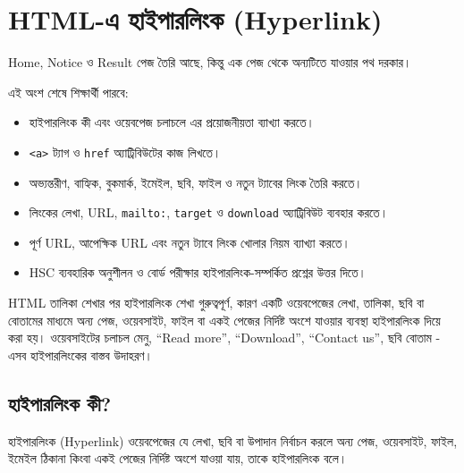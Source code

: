 \section{HTML-এ হাইপারলিংক (Hyperlink)}

Home, Notice ও Result পেজ তৈরি আছে, কিন্তু এক পেজ থেকে অন্যটিতে যাওয়ার পথ দরকার।



\begin{learningbox}
এই অংশ শেষে শিক্ষার্থী পারবে:
\begin{itemize}
\item হাইপারলিংক কী এবং ওয়েবপেজ চলাচলে এর প্রয়োজনীয়তা ব্যাখ্যা করতে।
\item \texttt{<a>} ট্যাগ ও \texttt{href} অ্যাট্রিবিউটের কাজ লিখতে।
\item অভ্যন্তরীণ, বাহ্যিক, বুকমার্ক, ইমেইল, ছবি, ফাইল ও নতুন ট্যাবের লিংক তৈরি করতে।
\item লিংকের লেখা, URL, \texttt{mailto:}, \texttt{target} ও \texttt{download} অ্যাট্রিবিউট ব্যবহার করতে।
\item পূর্ণ URL, আপেক্ষিক URL এবং নতুন ট্যাবে লিংক খোলার নিয়ম ব্যাখ্যা করতে।
\item HSC ব্যবহারিক অনুশীলন ও বোর্ড পরীক্ষার হাইপারলিংক-সম্পর্কিত প্রশ্নের উত্তর দিতে।
\end{itemize}
\end{learningbox}



HTML তালিকা শেখার পর হাইপারলিংক শেখা গুরুত্বপূর্ণ, কারণ একটি ওয়েবপেজের লেখা, তালিকা, ছবি বা বোতামের মাধ্যমে অন্য পেজ, ওয়েবসাইট, ফাইল বা একই পেজের নির্দিষ্ট অংশে যাওয়ার ব্যবস্থা হাইপারলিংক দিয়ে করা হয়। ওয়েবসাইটের চলাচল মেনু, ``Read more'', ``Download'', ``Contact us'', ছবি বোতাম - এসব হাইপারলিংকের বাস্তব উদাহরণ।

\subsection{হাইপারলিংক কী?}

\begin{definitionbox}{হাইপারলিংক (Hyperlink)}
ওয়েবপেজের যে লেখা, ছবি বা উপাদান নির্বাচন করলে অন্য পেজ, ওয়েবসাইট, ফাইল, ইমেইল ঠিকানা কিংবা একই পেজের নির্দিষ্ট অংশে যাওয়া যায়, তাকে হাইপারলিংক বলে।
\end{definitionbox}

